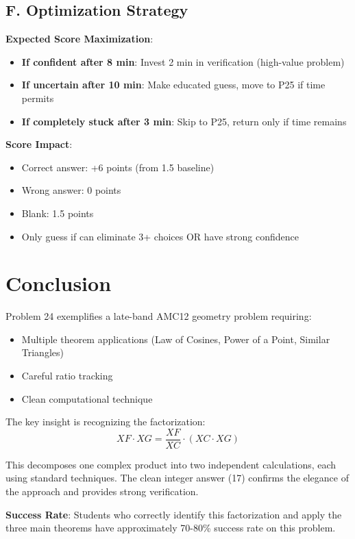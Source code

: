 \documentclass[]{article}
\begin{document}
\begin{competitionbox}
\subsection*{F. Optimization Strategy}

\textbf{Expected Score Maximization}:
\begin{itemize}[leftmargin=*]
    \item \textbf{If confident after 8 min}: Invest 2 min in verification (high-value problem)
    \item \textbf{If uncertain after 10 min}: Make educated guess, move to P25 if time permits
    \item \textbf{If completely stuck after 3 min}: Skip to P25, return only if time remains
\end{itemize}

\textbf{Score Impact}:
\begin{itemize}
    \item Correct answer: +6 points (from 1.5 baseline)
    \item Wrong answer: 0 points
    \item Blank: 1.5 points
    \item Only guess if can eliminate 3+ choices OR have strong confidence
\end{itemize}
\end{competitionbox}

\section*{Conclusion}

Problem 24 exemplifies a late-band AMC12 geometry problem requiring:
\begin{itemize}
    \item Multiple theorem applications (Law of Cosines, Power of a Point, Similar Triangles)
    \item Careful ratio tracking
    \item Clean computational technique
\end{itemize}

The key insight is recognizing the factorization:
\[XF \cdot XG = \frac{XF}{XC} \cdot (XC \cdot XG)\]

This decomposes one complex product into two independent calculations, each using standard techniques. The clean integer answer (17) confirms the elegance of the approach and provides strong verification.

\textbf{Success Rate}: Students who correctly identify this factorization and apply the three main theorems have approximately 70-80\% success rate on this problem.
\end{document}
